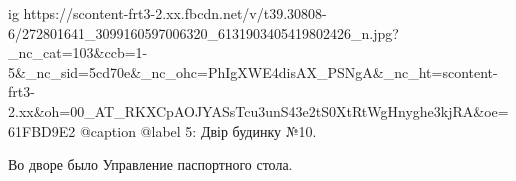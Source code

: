  
 
 
 
 

\ifcmt
  ig https://scontent-frt3-2.xx.fbcdn.net/v/t39.30808-6/272801641_3099160597006320_6131903405419802426_n.jpg?_nc_cat=103&ccb=1-5&_nc_sid=5cd70e&_nc_ohc=PhIgXWE4disAX_PSNgA&_nc_ht=scontent-frt3-2.xx&oh=00_AT_RKXCpAOJYASsTcu3unS43e2tS0XtRtWgHnyghe3kjRA&oe=61FBD9E2
  @caption @label 5: Двір будинку №10.
\fi

Во дворе было Управление паспортного стола.
